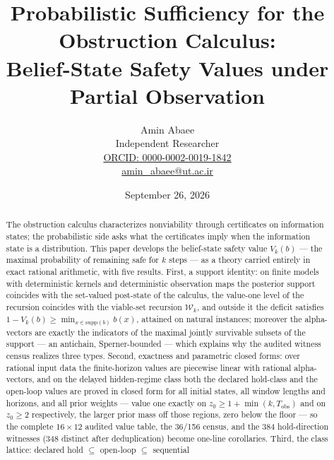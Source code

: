 \documentclass[10pt,twocolumn]{article}
\theoremstyle{plain}
\theoremstyle{definition}
\theoremstyle{remark}
\begin{document}
\title{Probabilistic Sufficiency for the Obstruction Calculus:\\
Belief-State Safety Values under Partial Observation}
\author{Amin Abaee\\[0.35em]
{\small Independent Researcher}\\[0.55em]
{\small\href{https://orcid.org/0000-0002-0019-1842}{ORCID: 0000-0002-0019-1842}}\\[0.3em]
{\small\href{mailto:amin\_abaee@ut.ac.ir}{amin\_abaee@ut.ac.ir}}}
\date{September 26, 2026}
\maketitle

\begin{abstract}
The obstruction calculus characterizes nonviability through certificates on
information states; the probabilistic side asks what the certificates imply
when the information state is a distribution. This paper develops the
belief-state safety value \(V_{k}(b)\) --- the maximal probability of
remaining safe for \(k\) steps --- as a theory carried entirely in exact
rational arithmetic, with five results. First, a support identity: on
finite models with deterministic kernels and deterministic observation
maps the posterior support coincides with the set-valued post-state of the
calculus, the value-one level of the recursion coincides with the
viable-set recursion \(\mathcal{W}_{k}\), and outside it the deficit
satisfies \(1 - V_{k}(b) \ge \min_{x \in \mathrm{supp}(b)} b(x)\), attained
on natural instances; moreover the alpha-vectors are exactly the
indicators of the maximal jointly survivable subsets of the support ---
an antichain, Sperner-bounded --- which explains why the audited witness
census realizes three types. Second, exactness and parametric closed
forms: over rational input data the finite-horizon values are piecewise
linear with rational alpha-vectors, and on the delayed hidden-regime
class both the declared hold-class and the open-loop values are proved in
closed form for all initial states, all window lengths and horizons, and
all prior weights --- value one exactly on
\(z_{0} \ge 1 + \min(k, T_{\mathrm{obs}})\) and on \(z_{0} \ge 2\)
respectively, the larger prior mass off those regions, zero below the
floor --- so the complete \(16 \times 12\) audited value table, the
36/156 census, and the 384 hold-direction witnesses (348 distinct after
deduplication) become one-line corollaries. Third, the class lattice:
declared hold \(\subseteq\) open-loop \(\subseteq\) sequential

\end{abstract}
\end{document}
